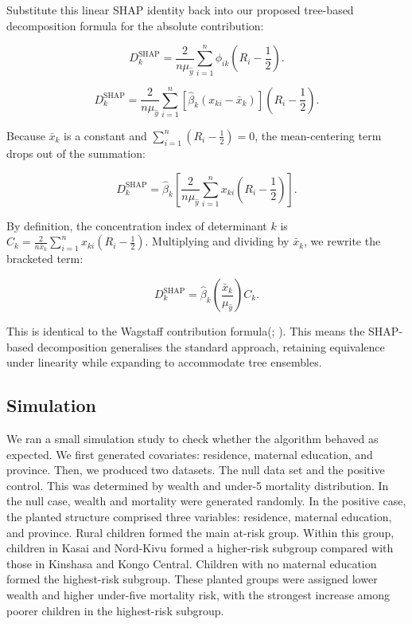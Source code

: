 \documentclass[
  11pt,
  a4paper,
]{article}
\begin{document}
Substitute this linear SHAP identity back into our proposed tree-based
decomposition formula for the absolute contribution:

\[
D_k^{\text{SHAP}} = \frac{2}{n\mu_{\hat{y}}} \sum_{i=1}^n \phi_{ik} \left(R_i - \frac{1}{2}\right).
\]

\[
D_k^{\text{SHAP}} = \frac{2}{n\mu_{\hat{y}}} \sum_{i=1}^n \left[ \hat{\beta}_k (x_{ki} - \bar{x}_k) \right] \left(R_i - \frac{1}{2}\right).
\]

Because \(\bar{x}_k\) is a constant and
\(\sum_{i=1}^n (R_i - \frac{1}{2}) = 0\), the mean-centering term drops
out of the summation:

\[
D_k^{\text{SHAP}} = \hat{\beta}_k \left[ \frac{2}{n\mu_{\hat{y}}} \sum_{i=1}^n x_{ki} \left(R_i - \frac{1}{2}\right) \right].
\]

By definition, the concentration index of determinant \(k\) is
\(C_k = \frac{2}{n\bar{x}_k}\sum_{i=1}^{n} x_{ki}(R_i - \frac{1}{2})\).
Multiplying and dividing by \(\bar{x}_k\), we rewrite the bracketed
term:

\[
D_k^{\text{SHAP}} = \hat{\beta}_k \left( \frac{\bar{x}_k}{\mu_{\hat{y}}} \right) C_k.
\]

This is identical to the Wagstaff contribution
formula(;
). This means the SHAP-based decomposition generalises the standard
approach, retaining equivalence under linearity while expanding to
accommodate tree ensembles.

\subsection{Simulation}\label{sec-simulation-study}

We ran a small simulation study to check whether the algorithm behaved
as expected. We first generated covariates: residence, maternal
education, and province. Then, we produced two datasets. The null data
set and the positive control. This was determined by wealth and under-5
mortality distribution. In the null case, wealth and mortality were
generated randomly. In the positive case, the planted structure
comprised three variables: residence, maternal education, and province.
Rural children formed the main at-risk group. Within this group,
children in Kasai and Nord-Kivu formed a higher-risk subgroup compared
with those in Kinshasa and Kongo Central. Children with no maternal
education formed the highest-risk subgroup. These planted groups were
assigned lower wealth and higher under-five mortality risk, with the
strongest increase among poorer children in the highest-risk subgroup.
\end{document}
